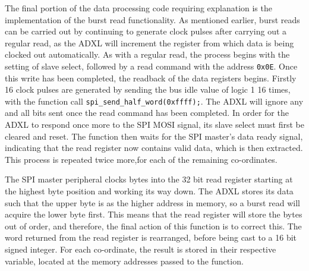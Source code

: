 \documentclass[11pt,british]{report}
\begin{document}
The final portion of the data processing code requiring explanation is the implementation of the burst read functionality. As mentioned earlier, burst reads can be carried out by continuing to generate clock pulses after carrying out a regular read, as the ADXL will increment the register from which data is being clocked out automatically. As with a regular read, the process begins with the setting of slave select, followed by a read command with the address \texttt{0x0E}. Once this write has been completed,
the readback of the data registers begins. Firstly 16 clock pulses are generated by sending the bus idle value of logic 1 16 times, with the function call  \lstinline[style={c-style}]|spi_send_half_word(0xffff);|. The ADXL will ignore any and all bits sent once the read command has been completed. In order for the ADXL to respond once more to the SPI MOSI signal, its slave select must first be cleared and reset. The function then waits for the SPI master's data ready signal, indicating that the read register now contains valid data, which is then extracted. This process is repeated twice more,for each of the remaining co-ordinates.

The SPI master peripheral clocks bytes into the 32 bit read register starting at the highest byte position and working its way down. The ADXL stores its data such that the upper byte is as the higher address in memory, so a burst read will acquire the lower byte first. This means that the read register will store the bytes out of order, and therefore, the final action of this function is to correct this. The word returned from the read register is rearranged, before being cast to a 16 bit signed integer. For each co-ordinate, the result is stored in their respective variable, located at the memory addresses passed to the function.
\end{document}
